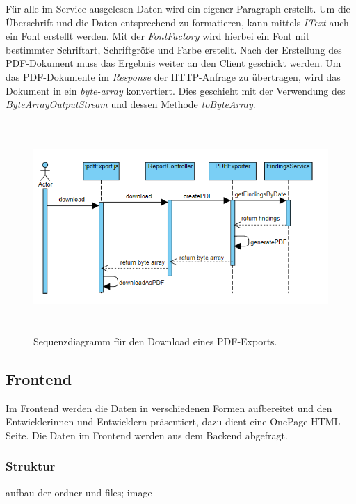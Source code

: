 Für alle im Service ausgelesen Daten wird ein eigener Paragraph erstellt. Um die Überschrift und die Daten entsprechend zu formatieren, kann mittels \textit{IText} auch ein Font erstellt werden. Mit der \textit{FontFactory} wird hierbei ein Font mit bestimmter Schriftart, Schriftgröße und Farbe erstellt.
Nach der Erstellung des PDF-Dokument muss das Ergebnis weiter an den Client geschickt werden. Um das PDF-Dokumente im \textit{Response} der HTTP-Anfrage zu übertragen, wird das Dokument in ein \textit{byte-array} konvertiert. Dies geschieht mit der Verwendung des \textit{ByteArrayOutputStream} und dessen Methode \textit{toByteArray}. 

\begin{figure}[tp]
  \centering
  \includegraphics[height=8cm]{images/seqGeneratePdf.PNG}
 \caption[Sequenzdiagramm für den Download eines PDF-Exports]{Sequenzdiagramm für den Download eines PDF-Exports.}
  \label{fig:engine}
\end{figure}

\subsection{Frontend}
Im Frontend werden die Daten in verschiedenen Formen aufbereitet und den Entwicklerinnen und Entwicklern präsentiert, dazu dient eine OnePage-HTML Seite. Die Daten im Frontend werden aus dem Backend abgefragt.
\subsubsection{Struktur}
aufbau der ordner und files; image
